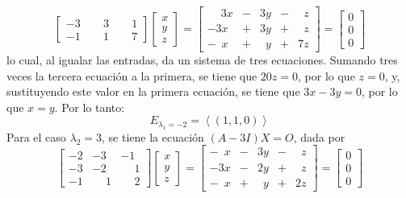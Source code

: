 \begin{solucion}
\begin{equation*}
\begin{bmatrix}
   -3 & \phantom{-}3 & \phantom{-}1 \\
   -1 & \phantom{-}1 & \phantom{-}7
  \end{bmatrix}
  \begin{bmatrix}
   x \\ y \\ z 
  \end{bmatrix}
  =
  \begin{bmatrix}
   \phantom{-}3x & - & 3y & - & \phantom{7}z \\
   -3x & + & 3y & + & \phantom{7}z \\
   -\phantom{3}x & + & \phantom{3}y & + & 7z
  \end{bmatrix}
  =
  \begin{bmatrix}
   0 \\ 0 \\ 0
  \end{bmatrix}
 \end{equation*}
 lo cual, al igualar las entradas, da un sistema de tres ecuaciones. Sumando tres veces la tercera ecuaci\'on a la primera, se tiene que $20z = 0$, por lo que $z = 0$, y, sustituyendo este valor en la primera ecuaci\'on, se tiene que $3x-3y = 0$, por lo que $x=y$. Por lo tanto:
 \begin{equation*}
  E_{\lambda_1 = -2} = \left< (1,1,0) \right>
 \end{equation*}
 Para  el caso  $\lambda_2 = 3$, se tiene la ecuaci\'on $(A-3I)X = O$, dada por
 \begin{equation*}
  \begin{bmatrix}
   -2 & -3 & -1 \\
   -3 & -2 & \phantom{-}1 \\
   -1 & \phantom{-}1 & \phantom{-}2
  \end{bmatrix}
  \begin{bmatrix}
   x \\ y \\ z 
  \end{bmatrix}
  =
  \begin{bmatrix}
   -\phantom{3}x & - & 3y & - & \phantom{7}z \\
   -3x & - & 2y & + & \phantom{7}z \\
   -\phantom{3}x & + & \phantom{3}y & + & 2z
  \end{bmatrix}
  =
  \begin{bmatrix}
   0 \\ 0 \\ 0
  \end{bmatrix}
 \end{equation*}

\end{solucion}
